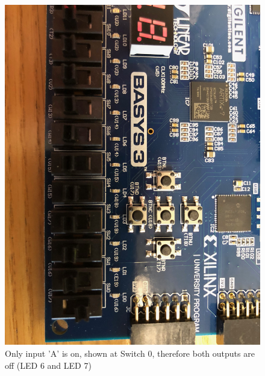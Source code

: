 \documentclass[11pt]{article}
\begin{document}
\begin{figure}[H]
	\includegraphics[width=\textwidth]{report_images/Lab1BoardPictures/Lab1Part1/IMG_0404.jpg}
	\caption{\label{fig:figure-name}Only input 'A' is on, shown at Switch 0, therefore both outputs are off (LED 6 and LED 7)}
\end{figure}
\end{document}
